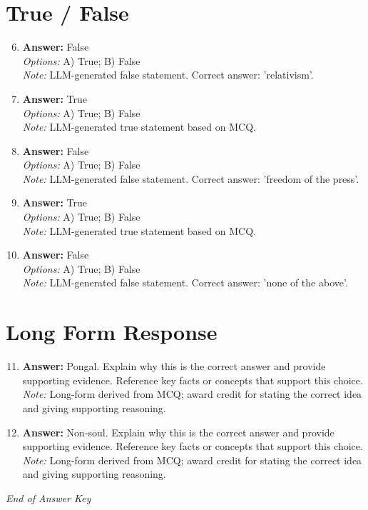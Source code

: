 \documentclass[12pt]{article}
\begin{document}
\section*{True / False}
\begin{enumerate}[label=\arabic*.]
\setcounter{enumi}{5}
\item \textbf{Answer:} False
\\ \textit{Options:} A) True; B) False
\\ \textit{Note:} LLM-generated false statement. Correct answer: 'relativism'.
\item \textbf{Answer:} True
\\ \textit{Options:} A) True; B) False
\\ \textit{Note:} LLM-generated true statement based on MCQ.
\item \textbf{Answer:} False
\\ \textit{Options:} A) True; B) False
\\ \textit{Note:} LLM-generated false statement. Correct answer: 'freedom of the press'.
\item \textbf{Answer:} True
\\ \textit{Options:} A) True; B) False
\\ \textit{Note:} LLM-generated true statement based on MCQ.
\item \textbf{Answer:} False
\\ \textit{Options:} A) True; B) False
\\ \textit{Note:} LLM-generated false statement. Correct answer: 'none of the above'.
\end{enumerate}

\section*{Long Form Response}
\begin{enumerate}[label=\arabic*.]
\setcounter{enumi}{10}
\item \textbf{Answer:} Pongal. Explain why this is the correct answer and provide supporting evidence. Reference key facts or concepts that support this choice.
\\ \textit{Note:} Long-form derived from MCQ; award credit for stating the correct idea and giving supporting reasoning.
\item \textbf{Answer:} Non-soul. Explain why this is the correct answer and provide supporting evidence. Reference key facts or concepts that support this choice.
\\ \textit{Note:} Long-form derived from MCQ; award credit for stating the correct idea and giving supporting reasoning.
\end{enumerate}

\vfill
\noindent\textit{End of Answer Key}
\end{document}
